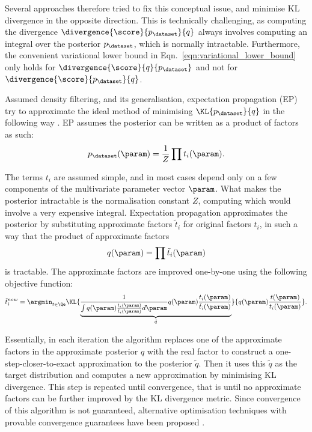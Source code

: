 Several approaches therefore tried to fix this conceptual issue, and minimise KL divergence in the opposite direction. This is technically challenging, as computing the divergence $\divergence{\score}{p_{\dataset}}{q}$ always involves computing an integral over the posterior $p_{\dataset}$, which is normally intractable. Furthermore, the convenient variational lower bound in Eqn.\ \ref{eqn:variational_lower_bound} only holds for $\divergence{\score}{q}{p_{\dataset}}$ and not for $\divergence{\score}{p_{\dataset}}{q}$.

Assumed density filtering, and its generalisation, expectation propagation (EP) try to approximate the ideal method of minimising $\KL{p_{\dataset}}{q}$ in the following way \citep{Minka2001thesis}. EP assumes the posterior can be written as a product of factors as such: 
%
\begin{equation}
	p_{\dataset}(\param) = \frac{1}{Z} \prod t_i(\param).
\end{equation}

The terms $t_i$ are assumed simple, and in most cases depend only on a few components of the multivariate parameter vector $\param$. What makes the posterior intractable is the normalisation constant $Z$, computing which would involve a very expensive integral. Expectation propagation approximates the posterior by substituting approximate factors $\tilde{t}_i$ for original factors $t_i$, in such a way that the product of approximate factors
%
\begin{equation}
	q(\param) = \prod \tilde{t}_i(\param)
\end{equation}
%
is tractable. The approximate factors are improved one-by-one using the following objective function:
%
\begin{equation}
	\tilde{t}_i^{new} = \argmin_{t \in \Qe} \KL{\underbrace{\frac{1}{\int q(\param)\frac{t_i(\param)}{\tilde{t}_i(\param)} d\param}q(\param)\frac{t_i(\param)}{\tilde{t}_i(\param)}}_{\tilde{q}}}{q(\param)\frac{t(\param)}{t_i(\param)}}. \label{eqn:expectation_propagation}
\end{equation}

Essentially, in each iteration the algorithm replaces one of the approximate factors in the approximate posterior $q$ with the real factor to construct a one-step-closer-to-exact approximation to the posterior $\tilde{q}$. Then it uses this $\tilde{q}$ as the target distribution and computes a new approximation by minimising KL divergence. This step is repeated until convergence, that is until no approximate factors can be further improved by the KL divergence metric. Since convergence of this algorithm is not guaranteed, alternative optimisation techniques with provable convergence guarantees have been proposed \citep{Seeger10}.

